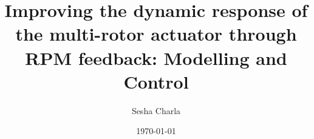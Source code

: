 \documentclass[letterpaper, 11pt]{article}
\title{Improving the dynamic response of the multi-rotor actuator through RPM feedback: Modelling and Control}
\author{Sesha Charla}
\date{\today}
\begin{document}
\maketitle
\tableofcontents
\newpage
\
\newpage

\newpage

\newpage

%
% 
% 
%
\newpage


\end{document}
